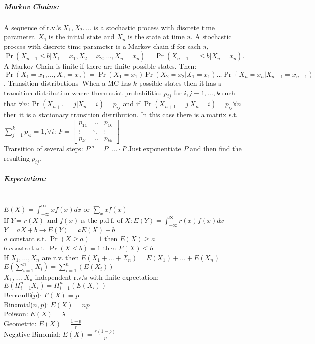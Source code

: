 \documentclass[landscape,10pt]{article}
\begin{document}
\begin{multicols}{4}
\subparagraph*{Markov Chains: }
A sequence of r.v.'s \(X_1, X_2, \ldots\) is a stochastic process with discrete time parameter. \(X_1\) is the initial state and \(X_n\) is the state at time \(n\). A stochastic process with discrete time parameter is a Markov chain if for each \(n\), \(\Pr(X_{n+1} \leq b | X_1 = x_1, X_2 = x_2, \ldots, X_n = x_n) = \Pr(X_{n+1} = \leq b | X_n = x_n)\). A Markov Chain is finite if there are finite possible states. Then: \(\Pr(X_1 = x_1, \ldots, X_n = x_n) = \Pr(X_1 = x_1) \Pr(X_2 = x_2 | X_1 = x_1) \ldots \Pr(X_n = x_n | X_{n-1} = x_{n-1}) \). Transition distributions: When a MC has \(k\) possible states then it has a transition distribution where there exist probabilities \(p_{ij}\) for \(i, j = 1, \ldots , k\) such that \(\forall n: \Pr(X_{n+1} = j | X_n = i) = p_{ij}\) and if \(\Pr(X_{n+1} = j | X_n = i) = p_{ij} \forall n\) then it is a stationary transition distribution. In this case there is a matrix s.t. \\ \(\sum\limits_{j=1}^{k}{p_{ij}}=1,  \forall i\):
\(P = \begin{bmatrix} 
        p_{11} & \hdots & p_{1k} \\
        \vdots & \ddots & \vdots \\
         p_{k1} & \hdots & p_{kk}
     \end{bmatrix}\)\\     
Transition of several steps: \(P^m = P \cdot \ldots \cdot P\) Just exponentiate \(P\) and then find the resulting \(p_{ij}\).

\subparagraph*{Expectation: } \ \ \\
\( E(X) = \int_{-\infty}^{\infty}{x f(x)dx}\) or \(\sum\limits_{x}xf(x)\) \\
If \(Y = r(X)\) and \(f(x)\) is the p.d.f. of \(X: E(Y) = \int_{-\infty}^{\infty}{r(x)f(x)dx}\) \\
\(Y = aX + b \rightarrow E(Y) = aE(X)+b\) \\
\(a\) constant s.t. \(\Pr(X \geq a) = 1\) then \(E(X) \geq a\) \\
\(b\) constant s.t. \(\Pr(X \leq b) = 1\) then \(E(X) \leq b\). \\
If \(X_1, \ldots, X_n \) are r.v. then \(E(X_1+\ldots+X_n) = E(X_1) + \ldots +E(X_n)\) \\
\(E\left( \sum_{i = 1}^{n}X_i \right) = \sum_{i = 1}^{n}(E(X_i))\) \\ 
\(X_1, \ldots, X_n\) independent r.v.'s with finite expectation: \(E\left(\Pi_{i=1}^{n}{X_i} \right) = \Pi_{i=1}^{n}\left(E(X_i)\right)\) \\
Bernoulli(\(p\)): \(E(X) = p\) \\ 
Binomial(\(n,p\)): \(E(X) = np\) \\
Poisson: \(E(X) = \lambda\) \\ 
Geometric: \(E(X) = \frac{1-p}{p}\) \\
Negative Binomial: \(E(X) = \frac{r(1-p)}{p}\) 


\end{multicols}
\end{document}
